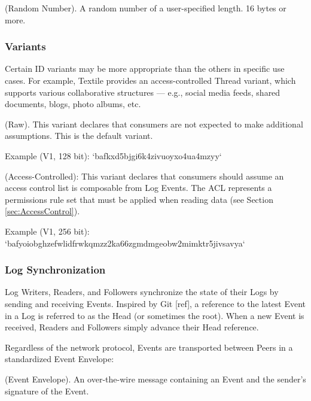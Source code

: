 \documentclass{comjnl}
\begin{document}
\begin{definition}
(Random Number). A random number of a user-specified length. 16 bytes or more.
\end{definition}

\subsubsection{Variants}

Certain ID variants may be more appropriate than the others in specific use cases. For example, Textile provides an access-controlled Thread variant, which supports various collaborative structures — e.g., social media feeds, shared documents, blogs, photo albums, etc.


\begin{definition}
(Raw). This variant declares that consumers are not expected to make additional assumptions. This is the default variant. 
\end{definition}

Example (V1, 128 bit): `bafkxd5bjgi6k4zivuoyxo4ua4mzyy`


\begin{definition}
(Access-Controlled): This variant declares that consumers should assume an access control list is composable from Log Events. The ACL represents a permissions rule set that must be applied when reading data (see Section  \ref{sec:AccessControl}).
\end{definition}

Example (V1, 256 bit): `bafyoiobghzefwlidfrwkqmzz2ka66zgmdmgeobw2mimktr5jivsavya`

\subsubsection{Log Synchronization} \label{sec:LogSync}

Log Writers, Readers, and Followers synchronize the state of their Logs by sending and receiving Events. Inspired by Git [ref], a reference to the latest Event in a Log is referred to as the Head (or sometimes the root). When a new Event is received, Readers and Followers simply advance their Head reference.

Regardless of the network protocol, Events are transported between Peers in a standardized Event Envelope:

\begin{definition}
(Event Envelope). An over-the-wire message containing an Event and the sender’s signature of the Event.
\end{definition}
\end{document}
